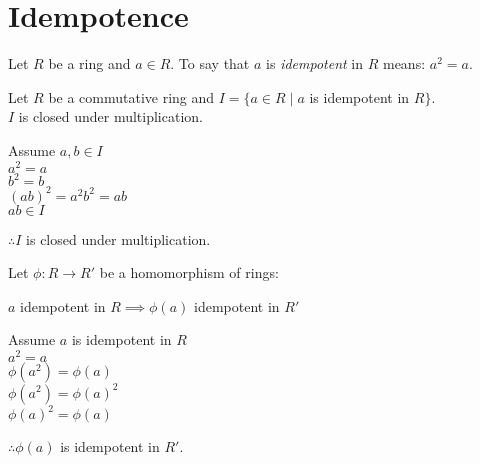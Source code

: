 \documentclass[letterpaper,12pt,fleqn]{article}
\begin{document}
\section*{Idempotence}

\begin{definition}
  Let $R$ be a ring and $a\in R$. To say that $a$ is \emph{idempotent} in $R$ means:
  $a^2=a$.
\end{definition}

\begin{theorem}
  Let $R$ be a commutative ring and $I=\{a\in R\mid a$ is idempotent in $R\}$. \\
  $I$ is closed under multiplication.
\end{theorem}

\begin{theproof}
  Assume $a,b\in I$ \\
  $a^2=a$ \\
  $b^2=b$ \\
  $(ab)^2=a^2b^2=ab$ \\
  $ab\in I$
  
  $\therefore I$ is closed under multiplication.
\end{theproof}

\begin{theorem}
  Let $\phi:R\to R'$ be a homomorphism of rings:

  $a$ idempotent in $R\implies\phi(a)$ idempotent in $R'$
\end{theorem}

\begin{theproof}
  Assume $a$ is idempotent in $R$ \\
  $a^2=a$ \\
  $\phi(a^2)=\phi(a)$ \\
  $\phi(a^2)=\phi(a)^2$ \\
  $\phi(a)^2=\phi(a)$

  $\therefore\phi(a)$ is idempotent in $R'$.
\end{theproof}
\end{document}
